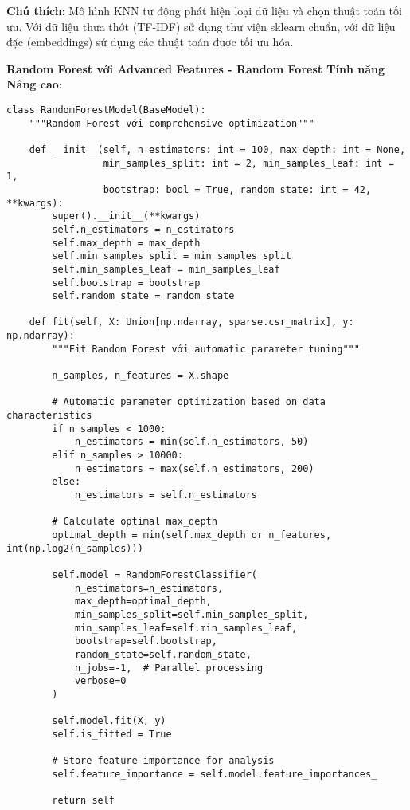 \textbf{Chú thích}: Mô hình KNN tự động phát hiện loại dữ liệu và chọn thuật toán tối ưu. Với dữ liệu thưa thớt (TF-IDF) sử dụng thư viện sklearn chuẩn, với dữ liệu đặc (embeddings) sử dụng các thuật toán được tối ưu hóa.

\textbf{Random Forest với Advanced Features - Random Forest Tính năng Nâng cao}:

\begin{verbatim}
class RandomForestModel(BaseModel):
    """Random Forest với comprehensive optimization"""
    
    def __init__(self, n_estimators: int = 100, max_depth: int = None,
                 min_samples_split: int = 2, min_samples_leaf: int = 1,
                 bootstrap: bool = True, random_state: int = 42, **kwargs):
        super().__init__(**kwargs)
        self.n_estimators = n_estimators
        self.max_depth = max_depth
        self.min_samples_split = min_samples_split
        self.min_samples_leaf = min_samples_leaf
        self.bootstrap = bootstrap
        self.random_state = random_state
        
    def fit(self, X: Union[np.ndarray, sparse.csr_matrix], y: np.ndarray):
        """Fit Random Forest với automatic parameter tuning"""
        
        n_samples, n_features = X.shape
        
        # Automatic parameter optimization based on data characteristics
        if n_samples < 1000:
            n_estimators = min(self.n_estimators, 50)
        elif n_samples > 10000:
            n_estimators = max(self.n_estimators, 200)
        else:
            n_estimators = self.n_estimators
            
        # Calculate optimal max_depth
        optimal_depth = min(self.max_depth or n_features, int(np.log2(n_samples)))
        
        self.model = RandomForestClassifier(
            n_estimators=n_estimators,
            max_depth=optimal_depth,
            min_samples_split=self.min_samples_split,
            min_samples_leaf=self.min_samples_leaf,
            bootstrap=self.bootstrap,
            random_state=self.random_state,
            n_jobs=-1,  # Parallel processing
            verbose=0
        )
        
        self.model.fit(X, y)
        self.is_fitted = True
        
        # Store feature importance for analysis
        self.feature_importance = self.model.feature_importances_
        
        return self
\end{verbatim}


